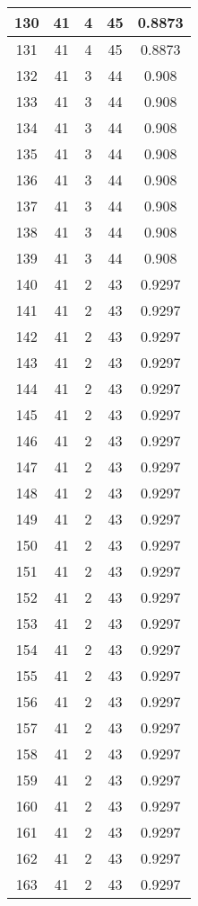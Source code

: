 \documentclass[letterpaper, 12pt]{article}
\begin{document}
\begin{longtable}{|c|c|c|c|c|}
\hline
130 & 41 & 4 & 45 & 0.8873 \\
\hline
131 & 41 & 4 & 45 & 0.8873 \\
\hline
132 & 41 & 3 & 44 & 0.908 \\
\hline
133 & 41 & 3 & 44 & 0.908 \\
\hline
134 & 41 & 3 & 44 & 0.908 \\
\hline
135 & 41 & 3 & 44 & 0.908 \\
\hline
136 & 41 & 3 & 44 & 0.908 \\
\hline
137 & 41 & 3 & 44 & 0.908 \\
\hline
138 & 41 & 3 & 44 & 0.908 \\
\hline
139 & 41 & 3 & 44 & 0.908 \\
\hline
140 & 41 & 2 & 43 & 0.9297 \\
\hline
141 & 41 & 2 & 43 & 0.9297 \\
\hline
142 & 41 & 2 & 43 & 0.9297 \\
\hline
143 & 41 & 2 & 43 & 0.9297 \\
\hline
144 & 41 & 2 & 43 & 0.9297 \\
\hline
145 & 41 & 2 & 43 & 0.9297 \\
\hline
146 & 41 & 2 & 43 & 0.9297 \\
\hline
147 & 41 & 2 & 43 & 0.9297 \\
\hline
148 & 41 & 2 & 43 & 0.9297 \\
\hline
149 & 41 & 2 & 43 & 0.9297 \\
\hline
150 & 41 & 2 & 43 & 0.9297 \\
\hline
151 & 41 & 2 & 43 & 0.9297 \\
\hline
152 & 41 & 2 & 43 & 0.9297 \\
\hline
153 & 41 & 2 & 43 & 0.9297 \\
\hline
154 & 41 & 2 & 43 & 0.9297 \\
\hline
155 & 41 & 2 & 43 & 0.9297 \\
\hline
156 & 41 & 2 & 43 & 0.9297 \\
\hline
157 & 41 & 2 & 43 & 0.9297 \\
\hline
158 & 41 & 2 & 43 & 0.9297 \\
\hline
159 & 41 & 2 & 43 & 0.9297 \\
\hline
160 & 41 & 2 & 43 & 0.9297 \\
\hline
161 & 41 & 2 & 43 & 0.9297 \\
\hline
162 & 41 & 2 & 43 & 0.9297 \\
\hline
163 & 41 & 2 & 43 & 0.9297 \\

\end{longtable}
\end{document}
